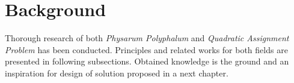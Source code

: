 \chapter{Background}
\label{chapter:background}

Thorough research of both \textit{Physarum Polyphalum} and \textit{Quadratic Assignment Problem} has been conducted. Principles and related works for both fields are presented in following subsections. Obtained knowledge is the ground and an inspiration for design of solution proposed in a next chapter.





